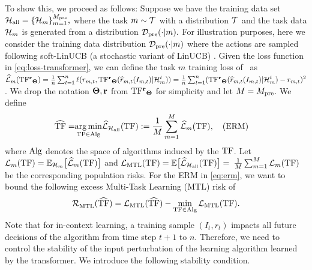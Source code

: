 To show this, we proceed as follows: Suppose we have the training data set $\mathcal{H}_{\mathrm{all}} = \{\mathcal{H}_m\}_{m=1}^{M_{\text{pre}}},$ where the task $m\sim \mathcal{T}$ with a distribution $\mathcal{T}$ and the task data $\mathcal{H}_m$ is generated from a distribution $ \mathcal{D}_{\text{pre}}(\cdot | m).$ 
%
%
For illustration purposes, here we consider the training data distribution $\mathcal{D}_{\text{pre}}(\cdot | m) $ where the actions are sampled following soft-LinUCB (a stochastic variant of LinUCB) \citep{chu2011contextual}. 
%
Given the loss function in \cref{eq:loss-transformer}, we can define the task $m$ training loss of \predt\ as $\widehat{\mathcal{L}}_m(\mathrm{TF^{\mathbf{r}}}_{\mathbf{\Theta}}) = \frac{1}{n}\sum_{t=1}^n\ell(r_{m,t},\mathrm{TF^{\mathbf{r}}}_{\mathbf{\Theta}}(\widehat{r}_{m,t}(I_{m, t})|\mathcal{H}^t_m)) = \frac{1}{n}\sum_{t=1}^n(\mathrm{TF^{\mathbf{r}}}_{\mathbf{\Theta}}(\widehat{r}_{m,t}(I_{m, t})|\mathcal{H}^t_m) - r_{m,t})^2$. We drop the notation $\mathbf{\Theta}, \mathbf{r}$ from $\mathrm{TF^{\mathbf{r}}}_{\mathbf{\Theta}}$ for simplicity and let $M=M_{\text{pre}}$. We define
\begin{align}
\widehat{\mathrm{TF}}= & \underset{\mathrm{TF} \in \mathrm{Alg}}{\arg \min } \widehat{\mathcal{L}}_{\mathcal{H}_{\mathrm{all}}}(\mathrm{TF}):=\frac{1}{M} \sum_{m=1}^M \widehat{\mathcal{L}}_m(\mathrm{TF}), \quad \text {(ERM)} \label{eq:erm}
\end{align}
where $\mathrm{Alg}$ denotes the space of algorithms induced by the $\mathrm{TF}$.
%
%
%
Let $\mathcal{L}_m(\mathrm{TF})=\mathbb{E}_{\mathcal{H}_m}\big[\widehat{\mathcal{L}}_m(\mathrm{TF})\big]$ and $\mathcal{L}_{\mathrm{MTL}}(\mathrm{TF})=\mathbb{E}\big[\widehat{\mathcal{L}}_{\mathcal{H}_{\mathrm{all }}}(\mathrm{TF})\big]=$ $\frac{1}{M} \sum_{m=1}^M \mathcal{L}_m(\mathrm{TF})$ be the corresponding population risks. For the ERM in \eqref{eq:erm}, we want to bound the following excess Multi-Task Learning (MTL) risk of \predt\ 
\begin{align}
\mathcal{R}^{}_{\mathrm{MTL}}(\widehat{\mathrm{TF}})=\mathcal{L}_{\mathrm{MTL}}(\widehat{\mathrm{TF}})-\min_{\mathrm{TF} \in \mathrm{Alg}} \mathcal{L}_{\mathrm{MTL}}(\mathrm{TF}) .\label{eq:risk}
\end{align}
%
Note that for in-context learning, a training sample $\left(I_t, r_t\right)$ impacts all future decisions of the algorithm from time step $t+1$ to $n$. Therefore, we need to control the stability of the input perturbation of the learning algorithm learned by the transformer. We introduce the following stability condition.
